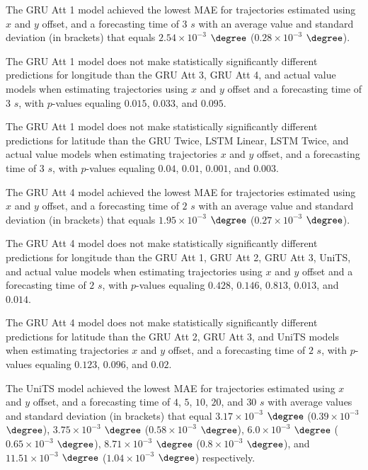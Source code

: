 The GRU Att 1 model achieved the lowest MAE for trajectories estimated using $x$ and $y$ offset, and a forecasting time of $3$ $s$ with an average value and standard deviation (in brackets) that equals $2.54 \times 10^{-3}$ $\degree$ ($0.28 \times 10^{-3}$ $\degree$).

The GRU Att 1 model does not make statistically significantly different predictions for longitude than the GRU Att 3, GRU Att 4, and actual value models when estimating trajectories using $x$ and $y$ offset and a forecasting time of $3$ $s$, with $p$-values equaling $0.015$, $0.033$, and $0.095$.

The GRU Att 1 model does not make statistically significantly different predictions for latitude than the GRU Twice, LSTM Linear, LSTM Twice, and actual value models when estimating trajectories $x$ and $y$ offset, and a forecasting time of $3$ $s$, with $p$-values equaling $0.04$, $0.01$, $0.001$, and $0.003$.

The GRU Att 4 model achieved the lowest MAE for trajectories estimated using $x$ and $y$ offset, and a forecasting time of $2$ $s$ with an average value and standard deviation (in brackets) that equals $1.95 \times 10^{-3}$ $\degree$ ($0.27 \times 10^{-3}$ $\degree$).

The GRU Att 4 model does not make statistically significantly different predictions for longitude than the GRU Att 1, GRU Att 2, GRU Att 3, UniTS, and actual value models when estimating trajectories using $x$ and $y$ offset and a forecasting time of $2$ $s$, with $p$-values equaling $0.428$, $0.146$, $0.813$, $0.013$, and $0.014$.

The GRU Att 4 model does not make statistically significantly different predictions for latitude than the GRU Att 2, GRU Att 3, and UniTS models when estimating trajectories $x$ and $y$ offset, and a forecasting time of $2$ $s$, with $p$-values equaling $0.123$, $0.096$, and $0.02$.

The UniTS model achieved the lowest MAE for trajectories estimated using $x$ and $y$ offset, and a forecasting time of $4$, $5$, $10$, $20$, and $30$ $s$ with average values and standard deviation (in brackets) that equal $3.17 \times 10^{-3}$ $\degree$ ($0.39 \times 10^{-3}$ $\degree$), $3.75 \times 10^{-3}$ $\degree$ ($0.58 \times 10^{-3}$ $\degree$), $6.0 \times 10^{-3}$ $\degree$ ($0.65 \times 10^{-3}$ $\degree$), $8.71 \times 10^{-3}$ $\degree$ ($0.8 \times 10^{-3}$ $\degree$), and $11.51 \times 10^{-3}$ $\degree$ ($1.04 \times 10^{-3}$ $\degree$) respectively.

